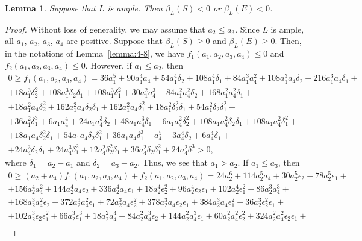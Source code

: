 \documentclass[12pt]{amsart}
\newtheorem{lemma}[theorem]{Lemma}
\theoremstyle{definition}
\theoremstyle{remark}
\begin{document}
\begin{lemma}
\label{lemma:4-8-unstable}
Suppose that $L$ is ample. Then $\beta_L(S)<0$ or $\beta_L(E)<0$.
\end{lemma}

\begin{proof}
Without loss of generality, we may assume that $a_2\leqslant a_3$. Since $L$ is ample, all $a_1$, $a_2$, $a_3$, $a_4$ are positive. Suppose that $\beta_L(S)\geqslant 0$ and $\beta_L(E)\geqslant 0$. Then, in the notations of Lemma~\ref{lemma:4-8}, we have $f_1(a_1,a_2,a_3,a_4)\leqslant 0$ and $f_2(a_1,a_2,a_3,a_4)\leqslant 0$. However, if $a_1\leqslant a_2$, then
\begin{multline*}
0\geqslant f_1(a_1,a_2,a_3,a_4)=36a_1^5+90a_1^4a_4+54a_1^4\delta_2+108a_1^4\delta_1+84a_1^3a_4^2+108a_1^3a_4\delta_2+216a_1^3a_4\delta_1+\\
+18a_1^3\delta_2^2+108a_1^3\delta_2\delta_1+108a_1^3\delta_1^2+30a_1^2a_4^3+84a_1^2a_4^2\delta_2+168a_1^2a_4^2\delta_1+\\
+18a_1^2a_4\delta_2^2+162a_1^2a_4\delta_2\delta_1+162a_1^2a_4\delta_1^2+18a_1^2\delta_2^2\delta_1+54a_1^2\delta_2\delta_1^2+\\
+36a_1^2\delta_1^3+6a_1a_4^4+24a_1a_4^3\delta_2+48a_1a_4^3\delta_1+6a_1a_4^2\delta_2^2+108a_1a_4^2\delta_2\delta_1+108a_1a_4^2\delta_1^2+\\
+18a_1a_4\delta_2^2\delta_1+54a_1a_4\delta_2\delta_1^2+36a_1a_4\delta_1^3+a_4^5+3a_4^4\delta_2+6a_4^4\delta_1+\\
+24a_4^3\delta_2\delta_1+24a_4^3\delta_1^2+ 12a_4^2\delta_2^2\delta_1+36a_4^2\delta_2\delta_1^2+24a_4^2\delta_1^3>0,
\end{multline*}
where $\delta_1=a_2-a_1$ and $\delta_2=a_3-a_2$. Thus, we see that $a_1>a_2$. If $a_1\leqslant a_3$, then
\begin{multline*}
0\geqslant (a_2+a_4)f_1(a_1,a_2,a_3,a_4)+f_2(a_1,a_2,a_3,a_4)=24a_2^6+114a_2^5a_4+30a_2^5\epsilon_2+78a_2^5\epsilon_1+\\
+156a_2^4a_4^2+144a_2^4a_4\epsilon_2+336a_2^4a_4\epsilon_1+18a_2^4\epsilon_2^2+96a_2^4\epsilon_2\epsilon_1+102a_2^4\epsilon_1^2+86a_2^3a_4^3+\\
+168a_2^3a_4^2\epsilon_2+372a_2^3a_4^2\epsilon_1+72a_2^3a_4\epsilon_2^2+378a_2^3a_4\epsilon_2\epsilon_1+384a_2^3a_4\epsilon_1^2+36a_2^3\epsilon_2^2\epsilon_1+\\
+102a_2^3\epsilon_2\epsilon_1^2+66a_2^3\epsilon_1^3+18a_2^2a_4^4+84a_2^2a_4^3\epsilon_2+144a_2^2a_4^3\epsilon_1+60a_2^2a_4^2\epsilon_2^2+324a_2^2a_4^2\epsilon_2\epsilon_1+\\

\end{multline*}
\end{proof}
\end{document}
